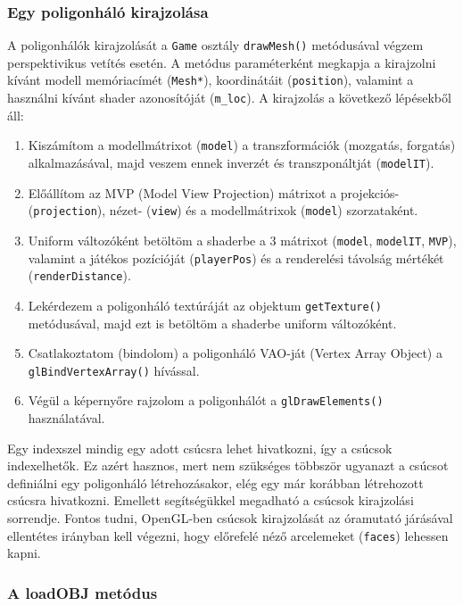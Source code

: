 \subsubsection{Egy poligonháló kirajzolása}

A poligonhálók kirajzolását a \verb|Game| osztály \verb|drawMesh()| metódusával végzem perspektivikus vetítés esetén. A metódus paraméterként megkapja a kirajzolni kívánt modell memóriacímét (\verb|Mesh*|), koordinátáit (\verb|position|), valamint a használni kívánt shader azonosítóját (\verb|m_loc|). A kirajzolás a következő lépésekből áll:

\begin{enumerate}
	\item Kiszámítom a modellmátrixot (\verb|model|) a transzformációk (mozgatás, forgatás) alkalmazásával, majd veszem ennek inverzét és transzponáltját (\verb|modelIT|).
	\item Előállítom az MVP (Model View Projection) mátrixot a projekciós- (\verb|projection|), nézet- (\verb|view|) és a modellmátrixok (\verb|model|) szorzataként.
	\item Uniform változóként betöltöm a shaderbe a 3 mátrixot (\verb|model|, \verb|modelIT|, \verb|MVP|), valamint a játékos pozícióját (\verb|playerPos|) és a renderelési távolság mértékét (\verb|renderDistance|).
	\item Lekérdezem a poligonháló textúráját az objektum \verb|getTexture()| metódusával, majd ezt is betöltöm a shaderbe uniform változóként.
	\item Csatlakoztatom (bindolom) a poligonháló VAO-ját (Vertex Array Object) a \verb|glBindVertexArray()| hívással.
	\item Végül a képernyőre rajzolom a poligonhálót a \verb|glDrawElements()| használatával.
\end{enumerate}

Egy indexszel mindig egy adott csúcsra lehet hivatkozni, így a csúcsok indexelhetők. Ez azért hasznos, mert nem szükséges többször ugyanazt a csúcsot definiálni egy poligonháló létrehozásakor, elég egy már korábban létrehozott csúcsra hivatkozni. Emellett segítségükkel megadható a csúcsok kirajzolási sorrendje. Fontos tudni, OpenGL-ben csúcsok kirajzolását az óramutató járásával ellentétes irányban kell végezni, hogy előrefelé néző arcelemeket (\verb|faces|) lehessen kapni.

\subsubsection{A loadOBJ metódus}

